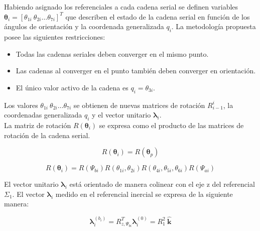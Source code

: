Habiendo asignado los referenciales a cada cadena serial
se definen variables 
$\boldsymbol \theta_i = [\theta_{1i} \ \theta_{2i} \dots \theta_{7i}]^T$ que describen el estado
de la cadena serial en función de los ángulos de orientación
y la coordenada generalizada $q_i$.
La metodología propuesta posee las siguientes restricciones:
\begin{itemize}
  \item Todas las cadenas seriales deben converger en el mismo punto.
  \item Las cadenas al converger en el punto también 
  deben converger en orientación.
  \item El único valor activo de la cadena es $q_i = \theta_{3i}$.
\end{itemize}

Los valores $\theta_{1i} \ \theta_{2i} \dots \theta_{7i}$
se obtienen de nuevas matrices de rotación $R_{i-1}^i$,
la coordenadas generalizada $q_i$ y el vector unitario
$\boldsymbol \lambda_i$.\\

La matriz de rotación $R(\boldsymbol \theta_i)$ se expresa como el producto de las 
matrices de rotación de la cadena serial.

\begin{equation}
R(\boldsymbol \theta_i) = R(\boldsymbol \theta_p)
\end{equation}

\begin{equation} \label{eq: th_12-46}
R(\boldsymbol \theta_i) = R(\Psi_{bi})R(\theta_{1i},\theta_{2i})R(\theta_{4i},\theta_{5i},\theta_{6i})R(\Psi_{ai})
\end{equation}

El vector unitario $\boldsymbol \lambda_i$ está orientado
de manera colinear con el eje z del referencial $\Sigma_1$. 
El vector $\boldsymbol \lambda_i$ medido en el referencial inercial 
se expresa de la siguiente manera:

\begin{equation} \label{eq: th_12}
\boldsymbol \lambda_i^{(b_i)} = R^T_{z,\Psi_{bi}} \boldsymbol \lambda_i^{(0)} = R_{1}^{2} \ \mathbf{\hat{k}}
\end{equation}


